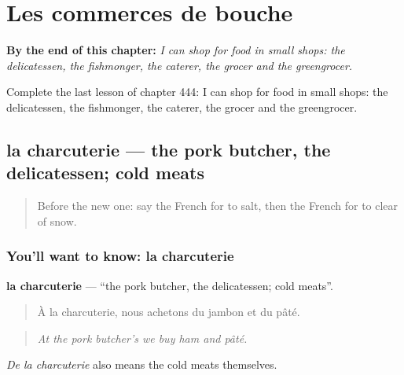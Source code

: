 
\chapter{Les commerces de bouche}
\label{ch:fr-les-commerces-de-bouche}

\begin{chapteropening}
\textbf{By the end of this chapter:} \emph{I can shop for food in small shops: the delicatessen, the fishmonger, the caterer, the grocer and the greengrocer.}

Complete the last lesson of chapter 444: I can shop for food in small shops: the delicatessen, the fishmonger, the caterer, the grocer and the greengrocer.
\end{chapteropening}

\section[la charcuterie]{la charcuterie — the pork butcher, the delicatessen; cold meats}

\label{lesson:FR-C444-charcuterie}



\begin{quote}
Before the new one: say the French for to salt, then the French for to clear of snow.
\end{quote}

\subsection*{You'll want to know: la charcuterie}
\textbf{la charcuterie} — \textquotedblleft{}the pork butcher, the delicatessen; cold meats\textquotedblright{}.

\begin{quote}
À la charcuterie, nous achetons du jambon et du pâté.
\end{quote}

\begin{quote}
\emph{At the pork butcher's we buy ham and pâté.}
\end{quote}

\emph{De la charcuterie} also means the cold meats themselves.

